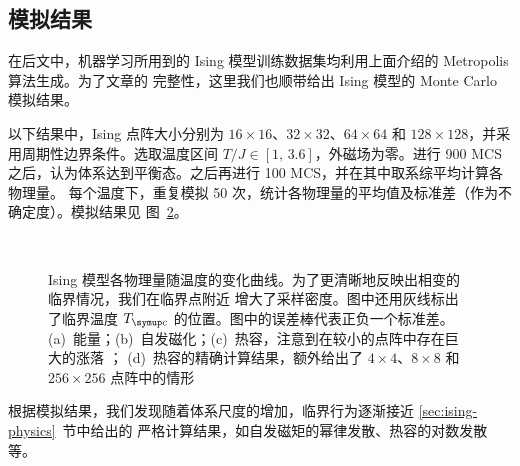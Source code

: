 \subsection{模拟结果}

在后文中，机器学习所用到的 Ising 模型训练数据集均利用上面介绍的 Metropolis 算法生成。为了文章的
完整性，这里我们也顺带给出 Ising 模型的 Monte Carlo 模拟结果。

以下结果中，Ising 点阵大小分别为 $16 \times 16$、$32 \times 32$、$64 \times 64$ 和
$128 \times 128$，并采用周期性边界条件。选取温度区间 $T/J \in [1,\,3.6]$，外磁场为零。进行
\num{900} MCS 之后，认为体系达到平衡态。之后再进行 \num{100} MCS，并在其中取系综平均计算各物理量。
每个温度下，重复模拟 50 次，统计各物理量的平均值及标准差（作为不确定度）。模拟结果见
图~\ref{fig:ising-observables}。

\begin{figure}[htb]
  \begin{subfigure}[b]{0.47\textwidth}
    \hfill
  \end{subfigure}
  \begin{subfigure}[b]{0.47\textwidth}
    \hfill
  \end{subfigure}
  \\[3ex]
  \begin{subfigure}[b]{0.47\textwidth}
    \hfill
  \end{subfigure}
  \begin{subfigure}[b]{0.47\textwidth}
    \hfill
    \label{fig:ising-cv-exact}
  \end{subfigure}
  \caption{Ising 模型各物理量随温度的变化曲线。为了更清晰地反映出相变的临界情况，我们在临界点附近
    增大了采样密度。图中还用灰线标出了临界温度 $\Tc$ 的位置。图中的误差棒代表正负一个标准差。
    (a)~能量；(b)~自发磁化；(c)~热容，注意到在较小的点阵中存在巨大的涨落 \protect\footnotemark{}；
    (d)~热容的精确计算结果，额外给出了 $4 \times 4$、$8 \times 8$ 和 $256 \times 256$ 点阵中的情形}
  \label{fig:ising-observables}
\end{figure}


根据模拟结果，我们发现随着体系尺度的增加，临界行为逐渐接近 \ref{sec:ising-physics}~节中给出的
严格计算结果，如自发磁矩的幂律发散、热容的对数发散等。

